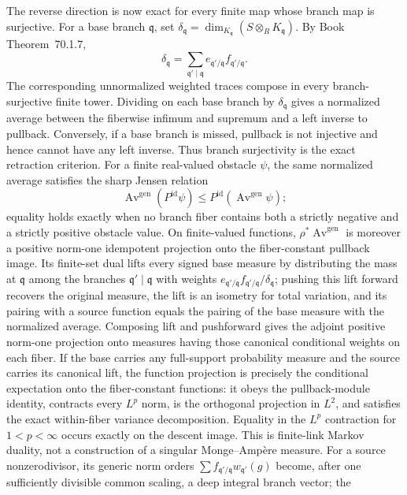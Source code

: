 \documentclass[11pt,a4paper]{article}
\theoremstyle{definition}
\theoremstyle{remark}
\begin{document}
The reverse direction is now exact for every finite map whose branch map is
surjective.  For a base branch \(\mathfrak q\), set
\(\delta_{\mathfrak q}=\dim_{K_{\mathfrak q}}
(S\otimes_RK_{\mathfrak q})\).  By
Book Theorem~70.1.7,
\[
 \delta_{\mathfrak q}
   =\sum_{\mathfrak q'\mid\mathfrak q}
      e_{\mathfrak q'/\mathfrak q}f_{\mathfrak q'/\mathfrak q}.
\]
The corresponding unnormalized weighted traces compose in every
branch-surjective finite tower.  Dividing on each base branch by
\(\delta_{\mathfrak q}\) gives a normalized average between the fiberwise
infimum and supremum and a left inverse to pullback.  Conversely, if a base
branch is missed, pullback is not injective and hence cannot have any left
inverse.  Thus branch surjectivity is the exact retraction criterion.  For a
finite real-valued obstacle \(\psi\), the same normalized average satisfies
the sharp Jensen relation
\[
 \operatorname{Av}^{\mathrm{gen}}(P^{\mathrm{id}}\psi)
   \leq P^{\mathrm{id}}(\operatorname{Av}^{\mathrm{gen}}\psi);
\]
equality holds exactly when no branch fiber contains both a strictly negative
and a strictly positive obstacle value.  On finite-valued functions,
\(\rho^*\operatorname{Av}^{\mathrm{gen}}\) is moreover a positive norm-one
idempotent projection onto the fiber-constant pullback image.  Its finite-set
dual lifts every signed base measure by distributing the mass at
\(\mathfrak q\) among the branches \(\mathfrak q'\mid\mathfrak q\) with
weights \(e_{\mathfrak q'/\mathfrak q}f_{\mathfrak q'/\mathfrak q}/
\delta_{\mathfrak q}\); pushing this lift forward recovers the original
measure, the lift is an isometry for total variation, and its pairing with a
source function equals the pairing of the base measure with the normalized
average.  Composing lift and pushforward gives the adjoint positive norm-one
projection onto measures having those canonical conditional weights on each
fiber.  If the base carries any full-support probability measure and the
source carries its canonical lift, the function projection is precisely the
conditional expectation onto the fiber-constant functions: it obeys the
pullback-module identity, contracts every \(L^p\) norm, is the orthogonal
projection in \(L^2\), and satisfies the exact within-fiber variance
decomposition.  Equality in the \(L^p\) contraction for
\(1<p<\infty\) occurs exactly on the descent image.  This is finite-link
Markov duality, not a construction of a singular Monge--Amp\`ere measure.  For a
source nonzerodivisor, its generic norm orders
\(\sum f_{\mathfrak q'/\mathfrak q}w_{\mathfrak q'}(g)\) become, after one
sufficiently divisible common scaling, a deep integral branch vector; the
\end{document}
